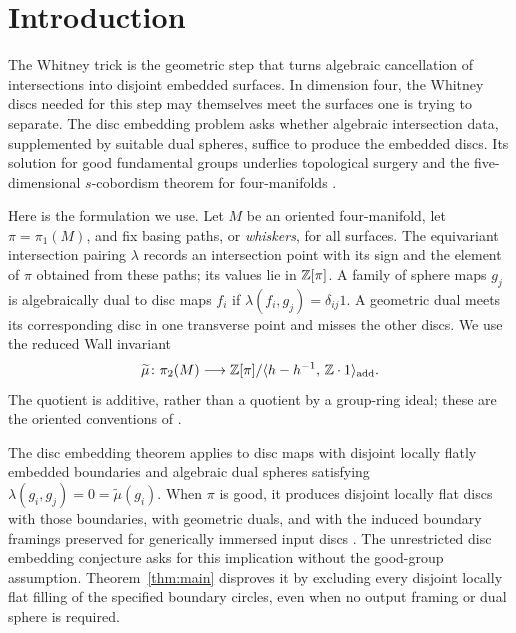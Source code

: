 \section{Introduction}\label{sec:introduction}

The Whitney trick is the geometric step that turns algebraic cancellation
of intersections into disjoint embedded surfaces. In dimension four,
the Whitney discs needed for this step may themselves meet the surfaces
one is trying to separate. The disc embedding problem asks whether
algebraic intersection data, supplemented by suitable dual spheres,
suffice to produce the embedded discs. Its solution for good fundamental
groups underlies topological surgery and the five-dimensional
$s$-cobordism theorem for four-manifolds
\cite[Theorem~5.1A and Chapters~7 and~11]{FQ1990}.

Here is the formulation we use. Let $M$ be an oriented four-manifold,
let $\pi=\pi_1(M)$, and fix basing paths, or \emph{whiskers}, for all
surfaces. The equivariant intersection pairing $\lambda$ records an
intersection point with its sign and the element of $\pi$ obtained from
these paths; its values lie in $\mathbb Z[\pi]$. A family of sphere maps
$g_j$ is algebraically dual to disc maps $f_i$ if
$\lambda(f_i,g_j)=\delta_{ij}1$. A geometric dual meets its corresponding
disc in one transverse point and misses the other discs. We use the
reduced Wall invariant
\begin{equation}\label{eq:wall-convention}
 \widetilde\mu\colon\pi_2(M)\longrightarrow
 \mathbb Z[\pi]/\langle h-h^{-1},\,\mathbb Z\cdot1\rangle_{\mathrm{add}}.
\end{equation}
The quotient is additive, rather than a quotient by a group-ring ideal;
these are the oriented conventions of \cite[Section~1.3]{PRT2025}.

The disc embedding theorem applies to disc maps with disjoint locally
flatly embedded boundaries and algebraic dual spheres satisfying
$\lambda(g_i,g_j)=0=\widetilde\mu(g_i)$. When $\pi$ is good, it produces
disjoint locally flat discs with those boundaries, with geometric duals,
and with the induced boundary framings preserved for generically
immersed input discs \cite[Theorem~A]{PRT2025}.
The unrestricted disc embedding conjecture asks for this implication
without the good-group assumption. Theorem~\ref{thm:main} disproves it
by excluding every disjoint locally flat filling of the specified
boundary circles, even when no output framing or dual sphere is required.

